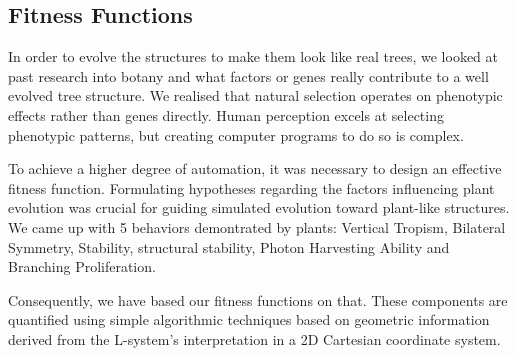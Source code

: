 \subsection{Fitness Functions}
In order to evolve the structures to make them look like real trees, we looked at past research into botany and what factors or genes really contribute to a well evolved tree structure. We realised that natural selection operates on phenotypic effects rather than genes directly. Human perception excels at selecting phenotypic patterns, but creating computer programs to do so is complex.

To achieve a higher degree of automation, it was necessary to design an effective fitness function. Formulating hypotheses regarding the factors influencing plant evolution was crucial for guiding simulated evolution toward plant-like structures. We came up with 5 behaviors demontrated by plants: Vertical Tropism, Bilateral Symmetry, Stability, structural stability, Photon Harvesting Ability and Branching Proliferation\cite{d9683286-f374-3c0d-ae3c-3924235e199a}\cite{ochoa1998genetic}.

Consequently, we have based our fitness functions on that. These components are quantified using simple algorithmic techniques based on geometric information derived from the L-system's interpretation in a 2D Cartesian coordinate system.

